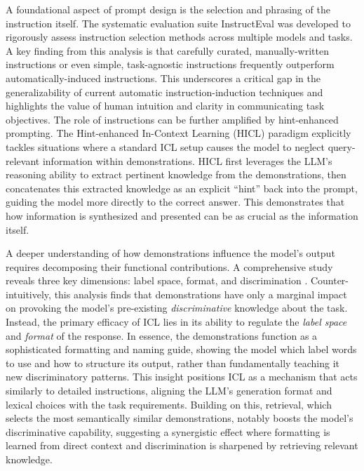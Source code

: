\documentclass[11pt]{article}
\begin{document}
A foundational aspect of prompt design is the selection and phrasing of the instruction itself. The systematic evaluation suite InstructEval \cite{ref82} was developed to rigorously assess instruction selection methods across multiple models and tasks. A key finding from this analysis is that carefully curated, manually-written instructions or even simple, task-agnostic instructions frequently outperform automatically-induced instructions. This underscores a critical gap in the generalizability of current automatic instruction-induction techniques and highlights the value of human intuition and clarity in communicating task objectives. The role of instructions can be further amplified by hint-enhanced prompting. The Hint-enhanced In-Context Learning (HICL) paradigm \cite{ref83} explicitly tackles situations where a standard ICL setup causes the model to neglect query-relevant information within demonstrations. HICL first leverages the LLM's reasoning ability to extract pertinent knowledge from the demonstrations, then concatenates this extracted knowledge as an explicit ``hint'' back into the prompt, guiding the model more directly to the correct answer. This demonstrates that how information is synthesized and presented can be as crucial as the information itself.

A deeper understanding of how demonstrations influence the model's output requires decomposing their functional contributions. A comprehensive study reveals three key dimensions: label space, format, and discrimination \cite{ref45}. Counter-intuitively, this analysis finds that demonstrations have only a marginal impact on provoking the model's pre-existing \emph{discriminative} knowledge about the task. Instead, the primary efficacy of ICL lies in its ability to regulate the \emph{label space} and \emph{format} of the response. In essence, the demonstrations function as a sophisticated formatting and naming guide, showing the model which label words to use and how to structure its output, rather than fundamentally teaching it new discriminatory patterns. This insight positions ICL as a mechanism that acts similarly to detailed instructions, aligning the LLM's generation format and lexical choices with the task requirements. Building on this, retrieval, which selects the most semantically similar demonstrations, notably boosts the model's discriminative capability, suggesting a synergistic effect where formatting is learned from direct context and discrimination is sharpened by retrieving relevant knowledge.
\end{document}
